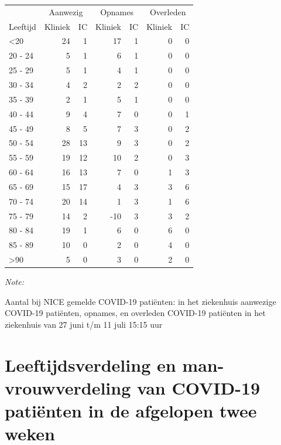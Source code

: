 \documentclass[
  english,
  man,floatsintext]{apa6}
\begin{document}
\begin{table}
\centering\begingroup\fontsize{10}{12}\selectfont

\begin{threeparttable}
\begin{tabular}{lrrrrrr}
\toprule
\multicolumn{1}{c}{ } & \multicolumn{2}{c}{Aanwezig} & \multicolumn{2}{c}{Opnames} & \multicolumn{2}{c}{Overleden} \\
\cmidrule(l{3pt}r{3pt}){2-3} \cmidrule(l{3pt}r{3pt}){4-5} \cmidrule(l{3pt}r{3pt}){6-7}
Leeftijd & Kliniek & IC & Kliniek & IC & Kliniek & IC\\
\midrule
<20 & 24 & 1 & 17 & 1 & 0 & 0\\
20 - 24 & 5 & 1 & 6 & 1 & 0 & 0\\
25 - 29 & 5 & 1 & 4 & 1 & 0 & 0\\
30 - 34 & 4 & 2 & 2 & 2 & 0 & 0\\
35 - 39 & 2 & 1 & 5 & 1 & 0 & 0\\
40 - 44 & 9 & 4 & 7 & 0 & 0 & 1\\
45 - 49 & 8 & 5 & 7 & 3 & 0 & 2\\
50 - 54 & 28 & 13 & 9 & 3 & 0 & 2\\
55 - 59 & 19 & 12 & 10 & 2 & 0 & 3\\
60 - 64 & 16 & 13 & 7 & 0 & 1 & 3\\
65 - 69 & 15 & 17 & 4 & 3 & 3 & 6\\
70 - 74 & 20 & 14 & 1 & 3 & 1 & 6\\
75 - 79 & 14 & 2 & -10 & 3 & 3 & 2\\
80 - 84 & 19 & 1 & 6 & 0 & 6 & 0\\
85 - 89 & 10 & 0 & 2 & 0 & 4 & 0\\
>90 & 5 & 0 & 3 & 0 & 2 & 0\\
\bottomrule
\end{tabular}
\begin{tablenotes}
\item \textit{Note: } 
\item Aantal bij NICE gemelde COVID-19 patiënten: in het ziekenhuis aanwezige COVID-19 patiënten, opnames, en overleden COVID-19 patiënten in het ziekenhuis van 27 juni t/m 11 juli 15:15 uur
\end{tablenotes}
\end{threeparttable}
\endgroup{}
\end{table}

\newpage

\hypertarget{leeftijdsverdeling-en-man-vrouwverdeling-van-covid-19-patiuxebnten-in-de-afgelopen-twee-weken}{%
\section{Leeftijdsverdeling en man-vrouwverdeling van COVID-19 patiënten in de afgelopen twee weken}\label{leeftijdsverdeling-en-man-vrouwverdeling-van-covid-19-patiuxebnten-in-de-afgelopen-twee-weken}}
\end{document}
